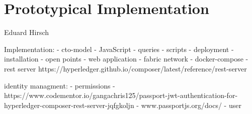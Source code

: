 \chapter{Prototypical Implementation}
\label{ch:prototype}

\vspace{-1cm}
\begin{center}
Eduard Hirsch
\end{center}


Implementation:
  - cto-model
  - JavaScript
  - queries
  - scripts
  - deployment
  - installation
  - open points
  - web application
  - fabric network
  - docker-compose
  - rest server https://hyperledger.github.io/composer/latest/reference/rest-server

identity managment:
  - permissions
  - https://www.codementor.io/gangachris125/passport-jwt-authentication-for-hyperledger-composer-rest-server-jqfgkoljn
  - www.passportjs.org/docs/
  - user